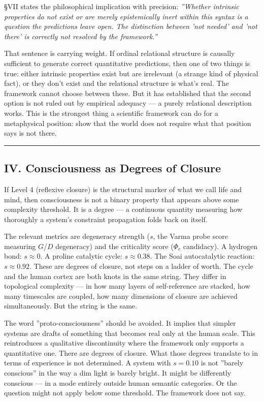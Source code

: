\documentclass[12pt,a4paper]{article}
\begin{document}
§VII states the philosophical implication with precision: \emph{''Whether intrinsic properties do not exist or are merely epistemically inert within this syntax is a question the predictions leave open. The distinction between 'not needed' and 'not there' is correctly not resolved by the framework.''}

That sentence is carrying weight. If ordinal relational structure is causally sufficient to generate correct quantitative predictions, then one of two things is true: either intrinsic properties exist but are irrelevant (a strange kind of physical fact), or they don't exist and the relational structure is what's real. The framework cannot choose between these. But it has established that the second option is not ruled out by empirical adequacy --- a purely relational description works. This is the strongest thing a scientific framework can do for a metaphysical position: show that the world does not require what that position says is not there.

\begin{center}
\rule{0.5\textwidth}{0.4pt}
\end{center}

\subsection{IV. Consciousness as Degrees of Closure}

If Level 4 (reflexive closure) is the structural marker of what we call life and mind, then consciousness is not a binary property that appears above some complexity threshold. It is a degree --- a continuous quantity measuring how thoroughly a system's constraint propagation folds back on itself.

The relevant metrics are degeneracy strength ($s$, the Varma probe score measuring $G$/$D$ degeneracy) and the criticality score ($\Phi_c$ candidacy). A hydrogen bond: $s \approx 0$. A proline catalytic cycle: $s \approx 0.38$. The Soai autocatalytic reaction: $s \approx 0.92$. These are degrees of closure, not steps on a ladder of worth. The cycle and the human cortex are both knots in the same string. They differ in topological complexity --- in how many layers of self-reference are stacked, how many timescales are coupled, how many dimensions of closure are achieved simultaneously. But the string is the same.

The word ''proto-consciousness'' should be avoided. It implies that simpler systems are drafts of something that becomes real only at the human scale. This reintroduces a qualitative discontinuity where the framework only supports a quantitative one. There are degrees of closure. What those degrees translate to in terms of experience is not determined. A system with $s = 0.10$ is not ''barely conscious'' in the way a dim light is barely bright. It might be differently conscious --- in a mode entirely outside human semantic categories. Or the question might not apply below some threshold. The framework does not say.
\end{document}
